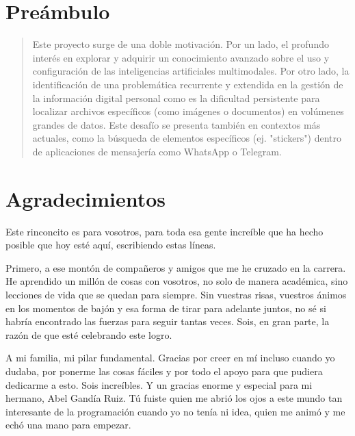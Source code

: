 
\chapter*{Preámbulo}
\thispagestyle{empty}
\begin{quote}
Este proyecto surge de una doble motivación. Por un lado, el profundo interés en explorar y adquirir un conocimiento avanzado sobre el uso y configuración de las inteligencias artificiales multimodales. Por otro lado, la identificación de una problemática recurrente y extendida en la gestión de la información digital personal como es la dificultad persistente para localizar archivos específicos (como imágenes o documentos) en volúmenes grandes de datos. Este desafío se presenta también en contextos más actuales, como la búsqueda de elementos específicos (ej. "stickers") dentro de aplicaciones de mensajería como WhatsApp o Telegram.
\end{quote}


\cleardoublepage %
\chapter*{Agradecimientos}
\thispagestyle{empty}
Este rinconcito es para vosotros, para toda esa gente increíble que ha hecho posible que hoy esté aquí, escribiendo estas líneas.

Primero, a ese montón de compañeros y amigos que me he cruzado en la carrera. He aprendido un millón de cosas con vosotros, no solo de manera académica, sino lecciones de vida que se quedan para siempre. Sin vuestras risas, vuestros ánimos en los momentos de bajón y esa forma de tirar para adelante juntos, no sé si habría encontrado las fuerzas para seguir tantas veces. Sois, en gran parte, la razón de que esté celebrando este logro.

A mi familia, mi pilar fundamental. Gracias por creer en mí incluso cuando yo dudaba, por ponerme las cosas fáciles y por todo el apoyo para que pudiera dedicarme a esto. Sois increíbles. Y un gracias enorme y especial para mi hermano, Abel Gandía Ruiz. Tú fuiste quien me abrió los ojos a este mundo tan interesante de la programación cuando yo no tenía ni idea, quien me animó y me echó una mano para empezar.

